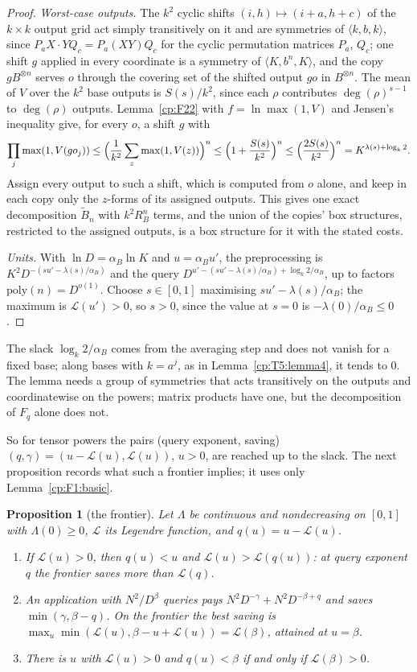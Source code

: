 \documentclass[11pt]{article}
\newtheorem{proposition}[theorem]{Proposition}
\theoremstyle{definition}
\theoremstyle{remark}
\newcommand{\mat}[3]{\langle #1,#2,#3\rangle} %
\newcommand{\alB}{\alpha_B}                   %
\newcommand{\RB}{R_B}                         %
\newcommand{\Leg}{\mathcal{L}}                        %
\begin{document}
\begin{proof}
\emph{Worst-case outputs.} The $k^2$ cyclic shifts $(i,h)\mapsto(i+a,h+c)$ of the $k\times k$ output grid act simply transitively on it and are symmetries of $\mat kbk$, since $P_aX\cdot YQ_c=P_a(XY)Q_c$ for the cyclic permutation matrices $P_a$, $Q_c$; one shift $g$ applied in every coordinate is a symmetry of $\mat K{b^n}K$, and the copy $gB^{\otimes n}$ serves $o$ through the covering set of the shifted output $go$ in $B^{\otimes n}$. The mean of $V$ over the $k^2$ base outputs is $S(s)/k^2$, since each $\rho$ contributes $\deg(\rho)^{s-1}$ to $\deg(\rho)$ outputs. Lemma~\ref{cp:F22} with $f=\ln\max(1,V)$ and Jensen's inequality give, for every $o$, a shift $g$ with
\[
\prod_j\max(1,V(go_j))\le\Bigl(\frac1{k^2}\sum_z\max(1,V(z))\Bigr)^n\le\Bigl(1+\frac{S(s)}{k^2}\Bigr)^n\le\Bigl(\frac{2S(s)}{k^2}\Bigr)^n=K^{\lambda(s)+\log_k2}.
\]
Assign every output to such a shift, which is computed from $o$ alone, and keep in each copy only the $z$-forms of its assigned outputs. This gives one exact decomposition $\tilde B_n$ with $k^2\RB^n$ terms, and the union of the copies' box structures, restricted to the assigned outputs, is a box structure for it with the stated costs.

\emph{Units.} With $\ln D=\alB\ln K$ and $u=\alB u'$, the preprocessing is $K^2D^{-(su'-\lambda(s)/\alB)}$ and the query $D^{u'-(su'-\lambda(s)/\alB)+\log_k2/\alB}$, up to factors $\mathrm{poly}(n)=D^{o(1)}$. Choose $s\in[0,1]$ maximising $su'-\lambda(s)/\alB$; the maximum is $\Leg(u')>0$, so $s>0$, since the value at $s=0$ is $-\lambda(0)/\alB\le0$.
\end{proof}

The slack $\log_k2/\alB$ comes from the averaging step and does not vanish for a fixed base; along bases with $k=a^j$, as in Lemma~\ref{cp:T5:lemma4}, it tends to $0$. The lemma needs a group of symmetries that acts transitively on the outputs and coordinatewise on the powers; matrix products have one, but the decomposition of $F_q$ alone does not.

So for tensor powers the pairs (query exponent, saving) $(q,\gamma)=(u-\Leg(u),\Leg(u))$, $u>0$, are reached up to the slack. The next proposition records what such a frontier implies; it uses only Lemma~\ref{cp:F1:basic}.

\begin{proposition}[the frontier]\label{cp:F7}
Let $\Lambda$ be continuous and nondecreasing on $[0,1]$ with $\Lambda(0)\ge0$, $\Leg$ its Legendre function, and $q(u)=u-\Leg(u)$.
\begin{enumerate}[label=(\alph*)]
\item If $\Leg(u)>0$, then $q(u)<u$ and $\Leg(u)>\Leg(q(u))$: at query exponent $q$ the frontier saves more than $\Leg(q)$.
\item An application with $N^2/D^\beta$ queries pays $N^2D^{-\gamma}+N^2D^{-\beta+q}$ and saves $\min(\gamma,\beta-q)$. On the frontier the best saving is $\max_u\min(\Leg(u),\beta-u+\Leg(u))=\Leg(\beta)$, attained at $u=\beta$.
\item There is $u$ with $\Leg(u)>0$ and $q(u)<\beta$ if and only if $\Leg(\beta)>0$.
\end{enumerate}
\end{proposition}
\end{document}

